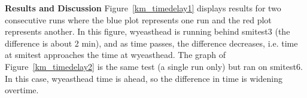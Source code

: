 \documentclass{IEEEtran}
\begin{document}
\textbf{Results and Discussion}
Figure~\ref{km_timedelay1} displays results for two consecutive runs where the blue plot represents one run and the red plot represents another. In this figure, wyeasthead is running behind smitest3 (the difference is about 2 min), and as time passes, the difference decreases, i.e. time at smitest approaches the time at wyeasthead. The graph of Figure~\ref{km_timedelay2} is the same test (a single run only) but ran on smitest6. In this case, wyeasthead time is ahead, so the difference in time is widening overtime.
\begin{figure}[h]
\end{figure}
\end{document}
